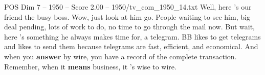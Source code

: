 \begin{textsample}{POS Dim 7 – 1950 – Score 2.00 – 1950/tv\_com\_1950\_14.txt}  \label{ex:f7_pos_014}
Well, here 's our friend the busy boss.
Wow, just look at him go.
People waiting to see him, big deal pending, lots of work to do, no time to go through the mail now.
But wait, here 's something he always makes time for, a telegram.
BB likes to get telegrams and likes to send them because telegrams are fast, efficient, and economical.
And when you \textbf{answer} by wire, you have a record of the complete transaction.
Remember, when it \textbf{means} business, it 's wise to wire.

\end{textsample}

